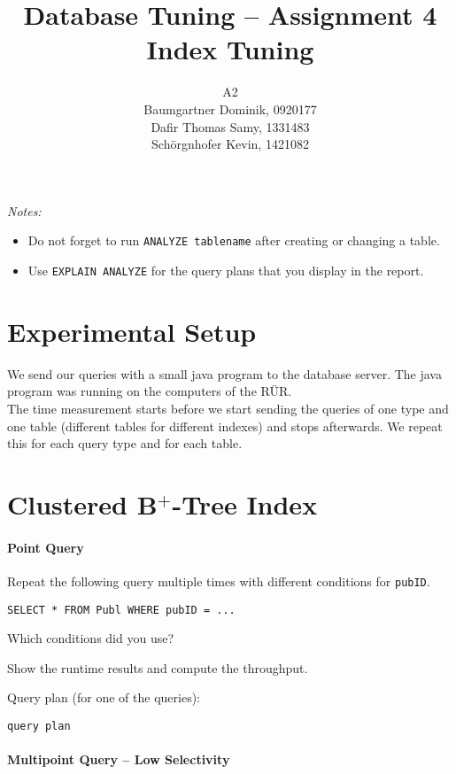 \documentclass[11pt]{scrartcl}
\title{
  \textbf{\large Database Tuning -- Assignment 4}\\
  Index Tuning
}
\author{
	A2\\
	\large Baumgartner Dominik, 0920177 \\
	\large Dafir Thomas Samy, 1331483 \\
	\large Sch\"orgnhofer Kevin, 1421082
}
\begin{document}
\maketitle

\noindent
{\it Notes:}
\begin{itemize}\itemsep=0pt
\item Do not forget to run {\tt ANALYZE tablename} after creating or
  changing a table.
\item Use {\tt EXPLAIN ANALYZE} for the query plans that you display in the report.
\end{itemize}


\section{Experimental Setup}

We send our queries with a small java program to the database server. The java program was running on the computers of the R\"UR.\\
The time measurement starts before we start sending the queries of one type and one table (different tables for different indexes) and stops afterwards. We repeat this for each query type and for each table.

\section{Clustered B$^+$-Tree Index}

\paragraph{Point Query}

Repeat the following query multiple times with different conditions for {\tt pubID}.

{\small
\begin{verbatim}
SELECT * FROM Publ WHERE pubID = ...
\end{verbatim}
}

\noindent
Which conditions did you use?

\smallskip\noindent
Show the runtime results and compute the throughput.

\smallskip\noindent
Query plan (for one of the queries):
{\small
\begin{verbatim}
query plan
\end{verbatim}
}

\paragraph{Multipoint Query -- Low Selectivity}
\end{document}
